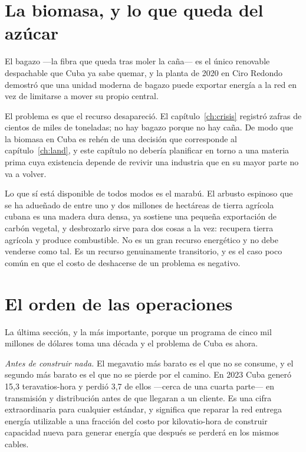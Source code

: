 \section{La biomasa, y lo que queda del azúcar}

El bagazo ---la fibra que queda tras moler la caña--- es el único renovable despachable
que Cuba ya sabe quemar, y la planta de 2020 en Ciro Redondo demostró que una unidad
moderna de bagazo puede exportar energía a la red en vez de limitarse a mover su propio
central.

El problema es que el recurso desapareció. El capítulo~\ref{ch:crisis} registró zafras de
cientos de miles de toneladas; no hay bagazo porque no hay caña. De modo que la biomasa en
Cuba es rehén de una decisión que corresponde al capítulo~\ref{ch:land}, y este capítulo
no debería planificar en torno a una materia prima cuya existencia depende de revivir una
industria que en su mayor parte no va a volver.

Lo que sí está disponible de todos modos es el marabú. El arbusto espinoso que se ha
adueñado de entre uno y dos millones de hectáreas de tierra agrícola cubana es una madera
dura densa, ya sostiene una pequeña exportación de carbón vegetal, y desbrozarlo sirve para
dos cosas a la vez: recupera tierra agrícola y produce combustible. No es un gran recurso
energético y no debe venderse como tal. Es un recurso genuinamente transitorio, y es el
caso poco común en que el costo de deshacerse de un problema es negativo.

\section{El orden de las operaciones}

La última sección, y la más importante, porque un programa de cinco mil millones de
dólares toma una década y el problema de Cuba es ahora.

\emph{Antes de construir nada.} El megavatio más barato es el que no se consume, y el
segundo más barato es el que no se pierde por el camino. En 2023 Cuba generó 15,3
teravatios-hora y perdió 3,7 de ellos ---cerca de una cuarta parte--- en transmisión y
distribución antes de que llegaran a un cliente.\unv{} Es una cifra extraordinaria para
cualquier estándar, y significa que reparar la red entrega energía utilizable a una
fracción del costo por kilovatio-hora de construir capacidad nueva para generar energía
que después se perderá en los mismos cables.

